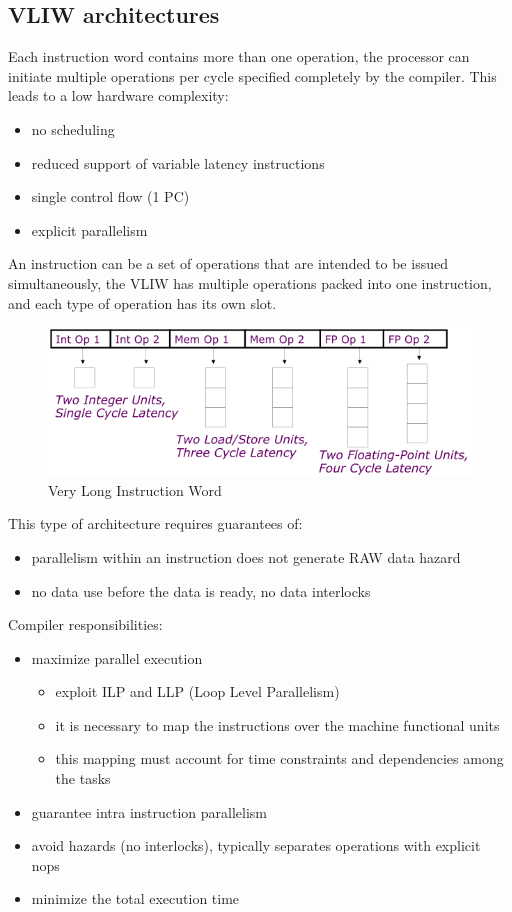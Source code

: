 \subsection{VLIW architectures}\label{subsec:vliw-architectures}
Each instruction word contains more than one operation, the processor can initiate multiple operations per cycle
specified completely by the compiler.
This leads to a low hardware complexity:
\begin{itemize}
    \item no scheduling
    \item reduced support of variable latency instructions
    \item single control flow (1 PC)
    \item explicit parallelism
\end{itemize}

An instruction can be a set of operations that are intended to be issued simultaneously, the VLIW has multiple
operations packed into one instruction, and each type of operation has its own slot.

\begin{figure}[h]
    \centering
    \includegraphics[scale = 0.4]{images/vliw}
    \caption{Very Long Instruction Word}
    \label{fig:vliw}
\end{figure}

This type of architecture requires guarantees of:
\begin{itemize}
    \item parallelism within an instruction does not generate RAW data hazard
    \item no data use before the data is ready, no data interlocks
\end{itemize}

Compiler responsibilities:
\begin{itemize}
    \item maximize parallel execution
    \begin{itemize}
        \item exploit ILP and LLP (Loop Level Parallelism)
        \item it is necessary to map the instructions over the machine functional units
        \item this mapping must account for time constraints and dependencies among the tasks
    \end{itemize}
    \item guarantee intra instruction parallelism
    \item avoid hazards (no interlocks), typically separates operations with explicit nops
    \item minimize the total execution time
\end{itemize}


